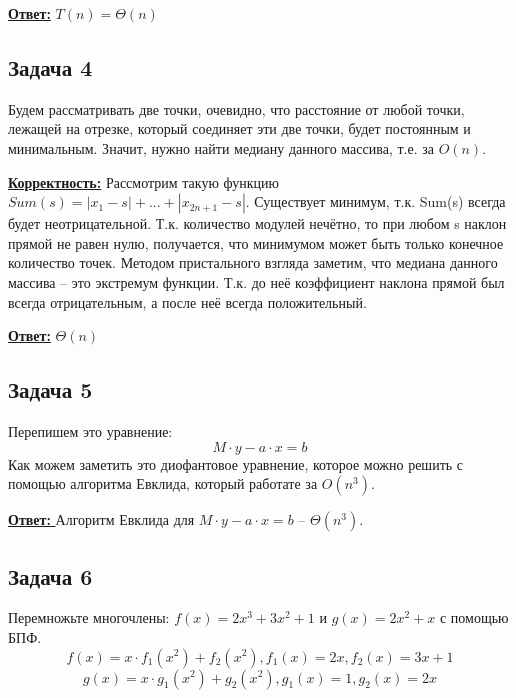 \documentclass[a4paper,14pt]{article} %
\begin{document}
\underline{\textbf{Ответ:}} $T(n) = \Theta(n)$

\subsection{Задача 4}
Будем рассматривать две точки, очевидно, что расстояние от любой точки, лежащей на отрезке, который соединяет эти две точки, будет постоянным и минимальным.
Значит, нужно найти медиану данного массива, т.е. за $O(n)$.

\underline{\textbf{Корректность:}} Рассмотрим такую функцию $Sum(s) = |x_1 - s| + ... + |x_{2n+1} - s|$.
Существует минимум, т.к. Sum(s) всегда будет неотрицательной. Т.к. количество модулей нечётно, то при любом s наклон прямой не равен нулю, получается, что минимумом может быть только конечное количество точек.
Методом пристального взгляда заметим, что медиана данного массива -- это экстремум функции. Т.к. до неё коэффициент наклона прямой был всегда отрицательным, а после неё всегда положительный.

\underline{\textbf{Ответ:}} $\Theta(n)$

\subsection{Задача 5}
Перепишем это уравнение:
\begin{equation*}
	M \cdot y - a \cdot x = b
\end{equation*}
Как можем заметить это диофантовое уравнение, которое можно решить с помощью алгоритма Евклида, который работате за $O(n^3)$.

\underline{\textbf{Ответ: }} Алгоритм Евклида для $M \cdot y - a \cdot x = b$ -- $\Theta(n^3)$. 


\subsection{Задача 6}
Перемножьте многочлены: $f(x) = 2x^3 + 3x^2 + 1$ и $g(x) = 2x^2 + x$ с помощью БПФ. 
\begin{equation*}
	f(x) = x \cdot f_1(x^2) + f_2(x^2), f_1(x) = 2x, f_2(x) = 3x + 1
\end{equation*}
\begin{equation*}
	g(x) = x \cdot g_1(x^2) + g_2(x^2), g_1(x) = 1, g_2(x) = 2x 
\end{equation*}
\end{document}
